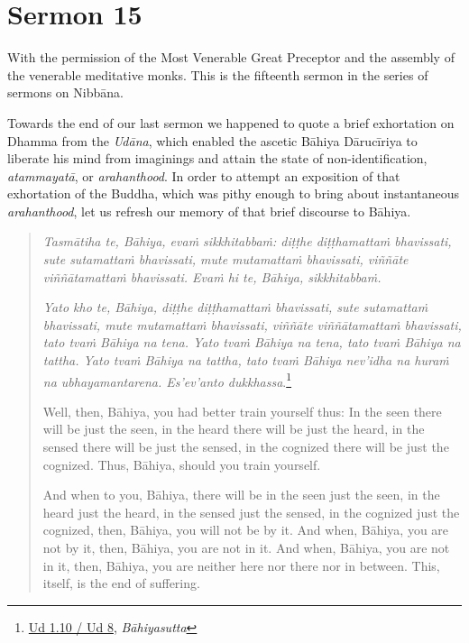 \chapter{Sermon 15}

\NibbanaOpeningQuote

With the permission of the Most Venerable Great Preceptor and the assembly of the venerable meditative monks. This is the fifteenth sermon in the series of sermons on Nibbāna.

Towards the end of our last sermon we happened to quote a brief exhortation on Dhamma from the \emph{Udāna}, which enabled the ascetic Bāhiya Dārucīriya to liberate his mind from imaginings and attain the state of non-identification, \emph{atammayatā}, or \emph{arahanthood}. In order to attempt an exposition of that exhortation of the Buddha, which was pithy enough to bring about instantaneous \emph{arahanthood}, let us refresh our memory of that brief discourse to Bāhiya.

\begin{quote}
\emph{Tasmātiha te, Bāhiya, evaṁ sikkhitabbaṁ: diṭṭhe diṭṭhamattaṁ bhavissati, sute sutamattaṁ bhavissati, mute mutamattaṁ bhavissati, viññāte viññātamattaṁ bhavissati. Evaṁ hi te, Bāhiya, sikkhitabbaṁ.}

\emph{Yato kho te, Bāhiya, diṭṭhe diṭṭhamattaṁ bhavissati, sute sutamattaṁ bhavissati, mute mutamattaṁ bhavissati, viññāte viññātamattaṁ bhavissati, tato tvaṁ Bāhiya na tena. Yato tvaṁ Bāhiya na tena, tato tvaṁ Bāhiya na tattha. Yato tvaṁ Bāhiya na tattha, tato tvaṁ Bāhiya nev'idha na huraṁ na ubhayamantarena. Es'ev'anto dukkhassa}.\footnote{\href{https://suttacentral.net/ud1.10/pli/ms}{Ud 1.10 / Ud 8}, \emph{Bāhiyasutta}}

Well, then, Bāhiya, you had better train yourself thus: In the seen there will be just the seen, in the heard there will be just the heard, in the sensed there will be just the sensed, in the cognized there will be just the cognized. Thus, Bāhiya, should you train yourself.

And when to you, Bāhiya, there will be in the seen just the seen, in the heard just the heard, in the sensed just the sensed, in the cognized just the cognized, then, Bāhiya, you will not be by it. And when, Bāhiya, you are not by it, then, Bāhiya, you are not in it. And when, Bāhiya, you are not in it, then, Bāhiya, you are neither here nor there nor in between. This, itself, is the end of suffering.
\end{quote}

